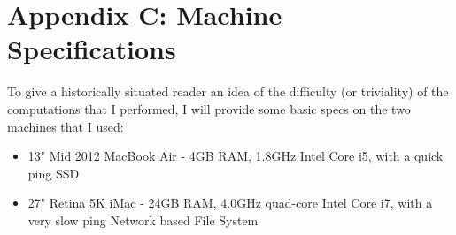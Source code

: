 \section{Appendix C: Machine Specifications}

To give a historically situated reader an idea of the difficulty (or triviality) of the computations that I performed, I will provide some basic specs on the two machines that I used:
\begin{itemize}
\item{13" Mid 2012 MacBook Air - 4GB RAM, 1.8GHz Intel Core i5, with a quick ping SSD}
\item{27" Retina 5K iMac - 24GB RAM, 4.0GHz quad-core Intel Core i7, with a very slow ping Network based File System}
\end{itemize}